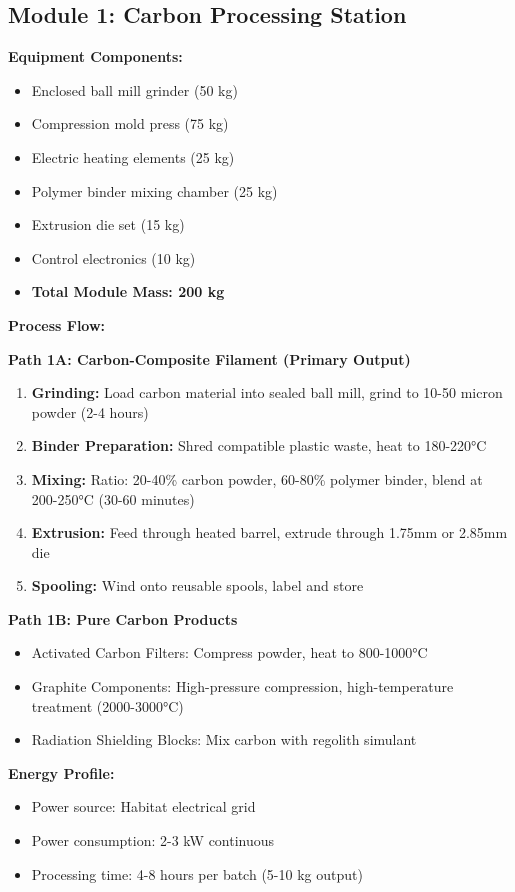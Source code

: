 \documentclass[12pt, a4paper]{article}
\begin{document}
\subsection{Module 1: Carbon Processing Station}

\textbf{Equipment Components:}
\begin{itemize}
    \item Enclosed ball mill grinder (50 kg)
    \item Compression mold press (75 kg)
    \item Electric heating elements (25 kg)
    \item Polymer binder mixing chamber (25 kg)
    \item Extrusion die set (15 kg)
    \item Control electronics (10 kg)
    \item \textbf{Total Module Mass: 200 kg}
\end{itemize}

\textbf{Process Flow:}

\textbf{Path 1A: Carbon-Composite Filament (Primary Output)}
\begin{enumerate}
    \item \textbf{Grinding:} Load carbon material into sealed ball mill, grind to 10-50 micron powder (2-4 hours)
    \item \textbf{Binder Preparation:} Shred compatible plastic waste, heat to 180-220°C
    \item \textbf{Mixing:} Ratio: 20-40\% carbon powder, 60-80\% polymer binder, blend at 200-250°C (30-60 minutes)
    \item \textbf{Extrusion:} Feed through heated barrel, extrude through 1.75mm or 2.85mm die
    \item \textbf{Spooling:} Wind onto reusable spools, label and store
\end{enumerate}

\textbf{Path 1B: Pure Carbon Products}
\begin{itemize}
    \item Activated Carbon Filters: Compress powder, heat to 800-1000°C
    \item Graphite Components: High-pressure compression, high-temperature treatment (2000-3000°C)
    \item Radiation Shielding Blocks: Mix carbon with regolith simulant
\end{itemize}

\textbf{Energy Profile:}
\begin{itemize}
    \item Power source: Habitat electrical grid
    \item Power consumption: 2-3 kW continuous
    \item Processing time: 4-8 hours per batch (5-10 kg output)
\end{itemize}
\end{document}

